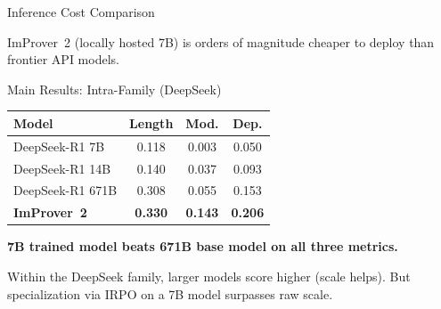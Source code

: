 \documentclass{beamer}
\newcommand{\good}[1]{\textcolor{improverGreen}{\textbf{#1}}}
\begin{document}
\begin{frame}{Inference Cost Comparison}
\vspace{0.3em}
\begin{center}
\end{center}
\vspace{0.4em}
\begin{minipage}{\textwidth}\small ImProver~2 (locally hosted 7B) is orders of magnitude cheaper to deploy than frontier API models.\end{minipage}
\end{frame}

\begin{frame}{Main Results: Intra-Family (DeepSeek)}
\vspace{0.3em}
\begin{center}
\small
\begin{tabular}{l|ccc}
\hline
\textbf{Model} & \textbf{Length} & \textbf{Mod.} & \textbf{Dep.}\\
\hline
DeepSeek-R1 7B     & 0.118 & 0.003 & 0.050\\
DeepSeek-R1 14B    & 0.140 & 0.037 & 0.093\\
DeepSeek-R1 671B   & 0.308 & 0.055 & 0.153\\
\hdashline
\textbf{ImProver~2} & \textbf{0.330} & \textbf{0.143} & \textbf{0.206}\\
\hline
\end{tabular}
\end{center}
\vspace{0.5em}
\begin{alertblock}{}
  \centering\large \good{7B trained model beats 671B base model on all three metrics.}
\end{alertblock}
\vspace{0.3em}
\small Within the DeepSeek family, larger models score higher (scale helps). But specialization via IRPO on a 7B model surpasses raw scale.
\end{frame}
\end{document}
